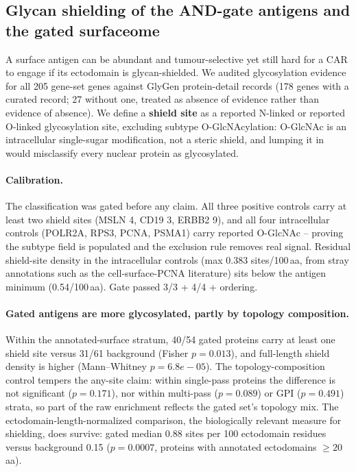 \subsection{Glycan shielding of the AND-gate antigens and the gated surfaceome}
\label{sec:glygen}
A surface antigen can be abundant and tumour-selective yet still hard for a CAR
to engage if its ectodomain is glycan-shielded. We audited glycosylation
evidence for all 205 gene-set genes against GlyGen protein-detail records
(178 genes with a curated record; 27 without one, treated as absence
of evidence rather than evidence of absence). We define a \textbf{shield site}
as a reported N-linked or reported O-linked glycosylation site, excluding
subtype O-GlcNAcylation: O-GlcNAc is an intracellular single-sugar
modification, not a steric shield, and lumping it in would misclassify every
nuclear protein as glycosylated.

\paragraph{Calibration.} The classification was gated before any claim. All
three positive controls carry at least two shield sites (MSLN 4, CD19
3, ERBB2 9), and all four intracellular controls (POLR2A, RPS3,
PCNA, PSMA1) carry reported O-GlcNAc -- proving the subtype field is populated
and the exclusion rule removes real signal. Residual shield-site density in the
intracellular controls (max 0.383 sites/100\,aa, from stray annotations such
as the cell-surface-PCNA literature) sits below the antigen minimum
(0.54/100\,aa). Gate passed 3/3 + 4/4 + ordering.

\paragraph{Gated antigens are more glycosylated, partly by topology
composition.} Within the annotated-surface stratum, 40/54 gated proteins
carry at least one shield site versus 31/61 background (Fisher
$p = 0.013$), and full-length shield density is higher (Mann--Whitney
$p = 6.8e-05$). The topology-composition control tempers the any-site claim:
within single-pass proteins the difference is not significant ($p = 0.171$),
nor within multi-pass ($p = 0.089$) or GPI ($p = 0.491$) strata, so part of
the raw enrichment reflects the gated set's topology mix. The
ectodomain-length-normalized comparison, the biologically relevant measure for
shielding, does survive: gated median 0.88 sites per 100 ectodomain residues
versus background 0.15 ($p = 0.0007$, proteins with annotated ectodomains
$\geq 20$\,aa).


